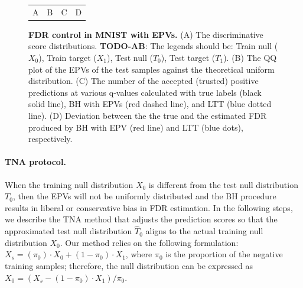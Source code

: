 \documentclass{article}
\newcommand{\todo}[2]{{\color{red} {\bf TODO-#1}: #2}}
\begin{document}
\begin{figure}
\begin{tabular}{cccc}
		A & B & C & D \\
	\end{tabular}
	\caption{{\bf FDR control in MNIST with EPVs. } (A) The discriminative score distributions. \todo{AB}{The legends should be: Train null ($X_0$), Train target ($X_1$), Test null ($T_0$), Test target ($T_1$).} (B) The QQ plot of the EPVs of the test samples against the theoretical uniform distribution. (C) The number of the accepted (trusted) positive predictions at various q-values calculated with true labels (black solid line), BH with EPVs (red dashed line), and LTT (blue dotted line). (D) Deviation between the the true and the estimated FDR produced by BH with EPV (red line) and LTT (blue dots), respectively.}
	\label{fig:binary}
\end{figure}
 
\paragraph{TNA protocol.} When the training null distribution $X_0$ is different from the test null distribution $T_0$, then the EPVs will not be uniformly distributed and the BH procedure results in liberal or conservative bias in FDR estimation. In the following steps, we describe the TNA method that adjusts the prediction scores so that the approximated test null distribution $\hat{T}_0$ aligns to the actual training null distribution $X_0$. Our method relies on the following formulation: $X_s = (\pi_0) \cdot X_0 + (1-\pi_0) \cdot X_1$, where $\pi_0$ is the proportion of the negative training samples; therefore, the null distribution can be expressed as $X_0 = (X_s - (1-\pi_0) \cdot X_1)/\pi_0$.
\end{document}
